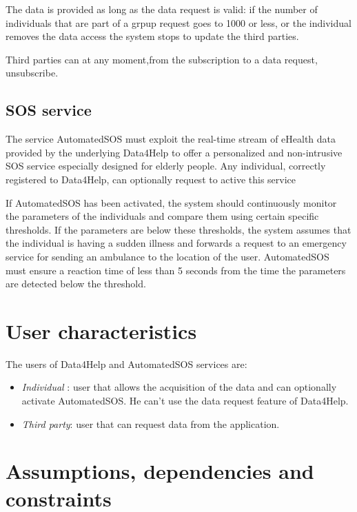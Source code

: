 The data is provided as long as the data request is valid: if the number of individuals that are part of a grpup request goes to 1000 or less, or the individual removes the data access the system stops to update the third parties. 

Third parties can at any moment,from the subscription to a data request, unsubscribe.





\subsection{SOS service}
The service AutomatedSOS must exploit the real-time stream of eHealth data provided by the underlying Data4Help to offer a personalized and non-intrusive SOS service especially designed for elderly people.
Any individual, correctly registered to Data4Help, can optionally request to active this service


If AutomatedSOS has been activated, the system should continuously monitor the parameters of the individuals and compare them using certain specific thresholds.
If the parameters are below these thresholds, the system assumes that the individual is having a sudden illness and forwards a request to an emergency service for sending an ambulance to the location of the user.
AutomatedSOS must ensure a reaction time of less than 5 seconds from the time the parameters are detected below the threshold.










\section{User characteristics}
The users of Data4Help and AutomatedSOS services are:

\begin{itemize}
\item \textit{Individual} : user that allows the acquisition of the data and can optionally activate AutomatedSOS. He can't use the data request feature of Data4Help.
\item \textit{Third party}: user that can request data from the application.
\end{itemize}





\section{Assumptions, dependencies and constraints}

